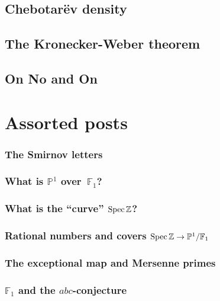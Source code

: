 \documentclass[a4paper]{memoir}
\begin{document}
\chapter{Chebotar\"ev density}




\chapter{The Kronecker-Weber theorem}




\chapter{On No and On}




\part{Assorted posts}

\setcounter{section}{0}

\section{The Smirnov letters}


\section{What is $\mathbb{P}^1$ over~$\mathbb{F}_1$?}


\section{What is the ``curve'' $\operatorname{Spec}\mathbb{Z}$?}


\section{Rational numbers and covers $\operatorname{Spec}\mathbb{Z}\to\mathbb{P}^1/\mathbb{F}_1$}

\section{The exceptional map and Mersenne primes}

\section{$\mathbb{F}_1$ and the $abc$-conjecture}
\end{document}
